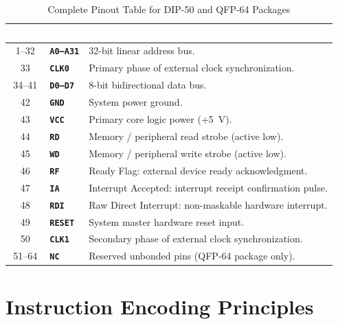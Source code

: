 \documentclass[11pt,a4paper]{article}
\begin{document}
\begin{table}[htbp]
\centering
\small
\begin{tabularx}{\textwidth}{c l X}
\toprule
\rowcolor{limslate}
\textcolor{white}{\textbf{Pin(s)}} & \textcolor{white}{\textbf{Signal}} & \textcolor{white}{\textbf{Functional Description and Role}} \\
\midrule
\rowcolors{2}{limroweven}{white}
1--32   & \texttt{\textbf{A0--A31}} & 32-bit linear address bus. \\
33      & \texttt{\textbf{CLK0}}   & Primary phase of external clock synchronization. \\
34--41  & \texttt{\textbf{D0--D7}} & 8-bit bidirectional data bus. \\
42      & \texttt{\textbf{GND}}    & System power ground. \\
43      & \texttt{\textbf{VCC}}    & Primary core logic power (+5~V). \\
44      & \texttt{\textbf{RD}}     & Memory / peripheral read strobe (active low). \\
45      & \texttt{\textbf{WD}}     & Memory / peripheral write strobe (active low). \\
46      & \texttt{\textbf{RF}}     & Ready Flag: external device ready acknowledgment. \\
47      & \texttt{\textbf{IA}}     & Interrupt Accepted: interrupt receipt confirmation pulse. \\
48      & \texttt{\textbf{RDI}}    & Raw Direct Interrupt: non-maskable hardware interrupt. \\
49      & \texttt{\textbf{RESET}}  & System master hardware reset input. \\
50      & \texttt{\textbf{CLK1}}   & Secondary phase of external clock synchronization. \\
51--64  & \texttt{\textbf{NC}}     & Reserved unbonded pins (QFP-64 package only). \\
\bottomrule
\end{tabularx}
\caption{Complete Pinout Table for DIP-50 and QFP-64 Packages}
\end{table}

\section{Instruction Encoding Principles}
\end{document}
